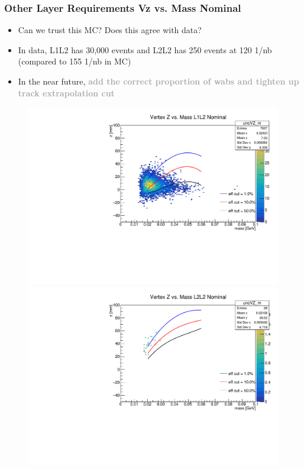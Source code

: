 \documentclass{beamer}
\begin{document}
\begin{frame}
\frametitle{Other Layer Requirements Vz vs. Mass Nominal}
\begin{itemize}
\item Can we trust this MC? Does this agree with data?
\item In data, L1L2 has 30,000 events and L2L2 has 250 events at 120 1/nb (compared to 155 1/nb in MC)
\item In the near future,\textcolor{darkgray}{\textbf{ add the correct proportion of wabs and tighten up track extrapolation cut}}
\end{itemize}
\begin{figure}
\includegraphics[width=0.4\linewidth]{figs/L1L2_sharedcut.pdf}
\includegraphics[width=0.4\linewidth]{figs/L2L2_sharedcut.pdf}
\end{figure}

\end{frame}

\end{document}
